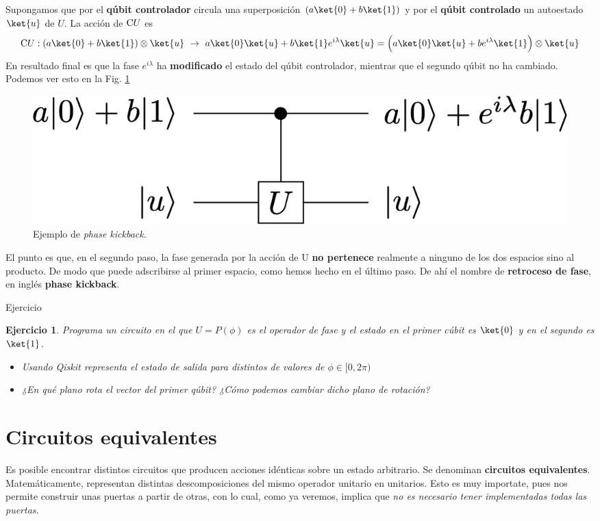 \documentclass[a4paper,11pt]{book} %
\newtheorem{ejercicio_contador}{Ejercicio}
\newcommand{\Ejercicio}[1]{
		\begin{mybox_gray}{Ejercicio} 
			\begin{ejercicio_contador}
				 #1 
			\end{ejercicio_contador} 
		\end{mybox_gray}
	}
\numberwithin{equation}{chapter}
\newcommand{\cg}[1]{{\rm C}#1}
\begin{document}
Supongamos que por el \textbf{qúbit controlador} circula una superposición $(a\ket{0}+b\ket{1})$ y por el \textbf{qúbit controlado} un autoestado $\ket{u}$ de $U$.  La acción de $\cg{U}$ es
$$
\cg{U}: (a\ket{0} + b\ket{1})\otimes \ket{u} ~\to ~ a\ket{0}\ket{u} + b \ket{1}e^{i\lambda}\ket{u}  = \left( a\ket{0}\ket{u} + be^{i\lambda} \ket{1} \rule{0mm}{4mm} \right)\otimes \ket{u}
$$
En resultado final es que la fase $e^{i\lambda}$ ha \textbf{modificado} el estado del qúbit controlador, mientras que el segundo qúbit no ha cambiado. Podemos ver esto en la Fig. \ref{Fig_elementos_phase_kickback.}

		\begin{figure}[H]
		\centering 
		\includegraphics[width=0.45\linewidth]{Figuras/Fig_elementos_phase_kickback}
		\caption{Ejemplo de \textit{phase kickback}.}
		\label{Fig_elementos_phase_kickback.}
		\end{figure}

El punto es que, en el segundo paso, la fase generada por la acción de U \textbf{no pertenece} realmente a ninguno de los dos espacios sino al producto. De modo que puede adscribirse al primer espacio, como hemos hecho en el último paso. De ahí el nombre de \textbf{retroceso de fase}, en inglés \textbf{phase kickback}.

	\Ejercicio{
	Programa un circuito en el que  $U = P(\phi)$ es el operador de fase y el estado en el primer cúbit es $\ket{0}$ y en el segundo es $\ket{1}$. 
	\begin{itemize}
		\item[a)] Usando Qiskit representa el estado de salida para distintos de valores de $\phi \in [0, 2 \pi )$
		
		\item[b)] ¿En qué plano rota el vector del primer qúbit? ¿Cómo podemos cambiar dicho plano de rotación?
	\end{itemize}
	}	   
    


	\section{Circuitos equivalentes}

Es posible encontrar distintos circuitos que producen acciones idénticas sobre un estado arbitrario. Se denominan \textbf{circuitos equivalentes}. Matemáticamente, representan distintas descomposiciones del mismo operador unitario en unitarios. Esto es muy importate, pues nos permite construir unas puertas a partir de otras, con lo cual, como ya veremos, implica que  \textit{no es necesario tener implementadas todas las puertas.}
\end{document}
